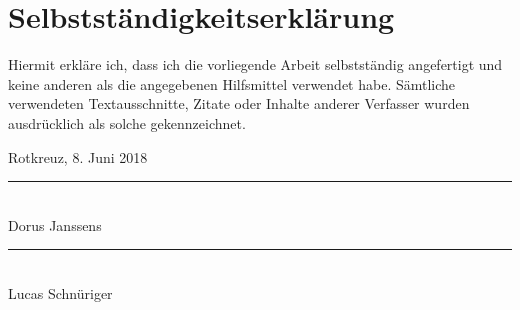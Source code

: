 \section*{Selbstständigkeitserklärung}
Hiermit erkläre ich, dass ich die vorliegende Arbeit selbstständig angefertigt und keine anderen als die angegebenen Hilfsmittel verwendet habe. Sämtliche verwendeten Textausschnitte, Zitate oder Inhalte anderer Verfasser wurden ausdrücklich als solche gekennzeichnet.

\vspace{1cm}

Rotkreuz, 8. Juni 2018 

\vspace{2cm}

\parbox{\textwidth}{
  \parbox{7cm}{
    \rule{6cm}{.5pt}\\
    Dorus Janssens
  }
  \hfill
  \parbox{7cm}{
    \rule{6cm}{.5pt}\\
    Lucas Schnüriger
  }
}
